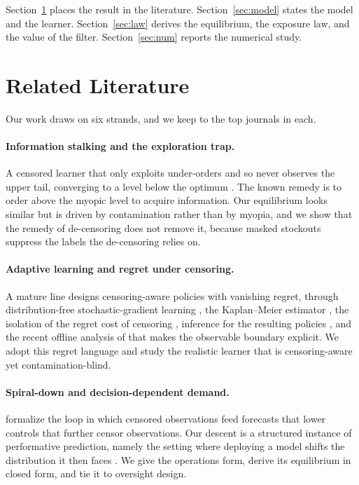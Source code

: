 \documentclass[11pt]{article}
\theoremstyle{plain}
\begin{document}
Section~\ref{sec:lit} places the result in the literature. Section~\ref{sec:model}
states the model and the learner. Section~\ref{sec:law} derives the equilibrium,
the exposure law, and the value of the filter. Section~\ref{sec:num} reports the
numerical study.

\section{Related Literature}\label{sec:lit}

Our work draws on six strands, and we keep to the top journals in each.

\paragraph{Information stalking and the exploration trap.}
A censored learner that only exploits under-orders and so never observes the upper
tail, converging to a level below the optimum
\citep{lariviere1999stalking,ding2002censored}. The known remedy is to order above
the myopic level to acquire information. Our equilibrium looks similar but is
driven by contamination rather than by myopia, and we show that the remedy of
de-censoring does not remove it, because masked stockouts suppress the labels the
de-censoring relies on.

\paragraph{Adaptive learning and regret under censoring.}
A mature line designs censoring-aware policies with vanishing regret, through
distribution-free stochastic-gradient learning
\citep{godfrey2001adaptive,huh2009nonparametric}, the Kaplan--Meier estimator
\citep{huh2011adaptive}, the isolation of the regret cost of censoring
\citep{besbes2013implications}, inference for the resulting policies
\citep{ban2020confidence}, and the recent offline analysis of
\citet{hssaine2024datadriven} that makes the observable boundary explicit. We
adopt this regret language and study the realistic learner that is censoring-aware
yet contamination-blind.

\paragraph{Spiral-down and decision-dependent demand.}
\citet{cooper2006spiral} formalize the loop in which censored observations feed
forecasts that lower controls that further censor observations. Our descent is a
structured instance of performative prediction, namely the setting where deploying
a model shifts the distribution it then faces \citep{perdomo2020performative}. We
give the operations form, derive its equilibrium in closed form, and tie it to
oversight design.
\end{document}
